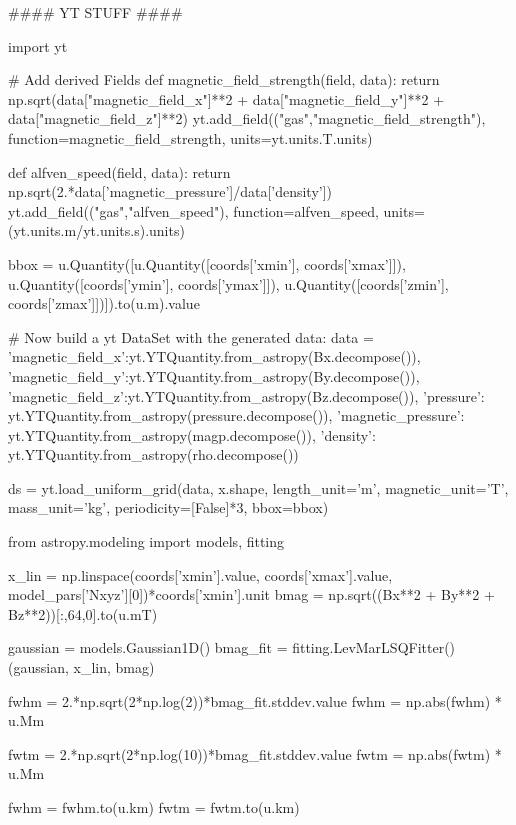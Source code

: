 \begin{pycode}[chapter3]
#### YT STUFF ####

import yt

# Add derived Fields
def magnetic_field_strength(field, data):
    return np.sqrt(data["magnetic_field_x"]**2 + data["magnetic_field_y"]**2 + data["magnetic_field_z"]**2)
yt.add_field(("gas","magnetic_field_strength"), function=magnetic_field_strength, units=yt.units.T.units)

def alfven_speed(field, data):
    return np.sqrt(2.*data['magnetic_pressure']/data['density'])
yt.add_field(("gas","alfven_speed"), function=alfven_speed, units=(yt.units.m/yt.units.s).units)

bbox = u.Quantity([u.Quantity([coords['xmin'], coords['xmax']]),
                   u.Quantity([coords['ymin'], coords['ymax']]),
                   u.Quantity([coords['zmin'], coords['zmax']])]).to(u.m).value

# Now build a yt DataSet with the generated data:
data = {'magnetic_field_x':yt.YTQuantity.from_astropy(Bx.decompose()),
        'magnetic_field_y':yt.YTQuantity.from_astropy(By.decompose()),
        'magnetic_field_z':yt.YTQuantity.from_astropy(Bz.decompose()),
        'pressure': yt.YTQuantity.from_astropy(pressure.decompose()),
        'magnetic_pressure': yt.YTQuantity.from_astropy(magp.decompose()),
        'density': yt.YTQuantity.from_astropy(rho.decompose())}

ds = yt.load_uniform_grid(data, x.shape, length_unit='m', magnetic_unit='T', mass_unit='kg', periodicity=[False]*3, bbox=bbox)
\end{pycode}

\begin{pycode}[chapter3]
from astropy.modeling import models, fitting

x_lin = np.linspace(coords['xmin'].value, coords['xmax'].value, model_pars['Nxyz'][0])*coords['xmin'].unit
bmag = np.sqrt((Bx**2 + By**2 + Bz**2))[:,64,0].to(u.mT)

gaussian = models.Gaussian1D()
bmag_fit = fitting.LevMarLSQFitter()(gaussian, x_lin, bmag)

fwhm = 2.*np.sqrt(2*np.log(2))*bmag_fit.stddev.value
fwhm = np.abs(fwhm) * u.Mm

fwtm = 2.*np.sqrt(2*np.log(10))*bmag_fit.stddev.value
fwtm = np.abs(fwtm) * u.Mm

fwhm = fwhm.to(u.km)
fwtm = fwtm.to(u.km)
\end{pycode}

\newcommand{\BO}{{B_{0z}}}
\newcommand{\GO}{{G}}
\newcommand{\bc}{{b_{00}}}
\newcommand{\bF}{{b_{01}}}
\newcommand{\za}{{z_{1}}}
\newcommand{\bb}{{b_{02}}}
\newcommand{\zb}{{z_{2}}}


